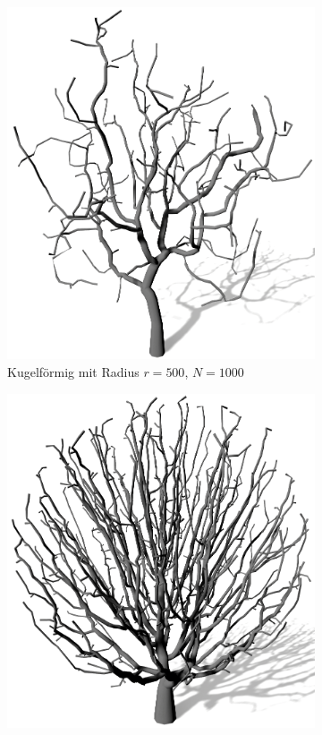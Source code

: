 \begin{figure} [hbtp]
	\centering
	\begin{subfigure}[t]{.45\textwidth}
		\centering
		\includegraphics[height=.21\textheight]{images/SCA_Einfluss_Sphere_Low.png}
		\caption{Kugelförmig mit Radius $r = 500$, $N = 1000$}
		\label{subfig:SCA_Einfluss_Sphere_Low}
	\end{subfigure}
	\hspace{.05\linewidth}
	\begin{subfigure}[t]{.45\textwidth}
		\centering
		\includegraphics[height=.21\textheight]{images/SCA_Einfluss_Sphere_High.png}

\end{subfigure}
\end{figure}
